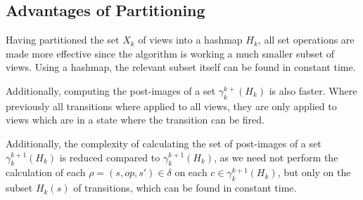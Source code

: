 \subsection{Advantages of Partitioning}
Having partitioned the set $X_k$ of views into a hashmap $H_k$, all set operations are made more effective since the algorithm is working a much smaller subset of views. Using a hashmap, the relevant subset itself can be found in constant time.

Additionally, computing the post-images of a set $\gamma_k^{k+}(H_k)$ is also faster. Where previously all transitions where applied to all views, they are only applied to views which are in a state where the transition can be fired.

Additionally, the complexity of calculating the set of post-images of a set $\gamma_k^{k+1}(H_k)$ is reduced compared to $\gamma_k^{k+1}(H_k)$, as we need not perform the calculation of each $\rho = (s, op, s') \in \delta$ on each $c \in \gamma_k^{k+1}(H_k)$, but only on the subset $H_k(s)$ of transitions, which can be found in constant time.




